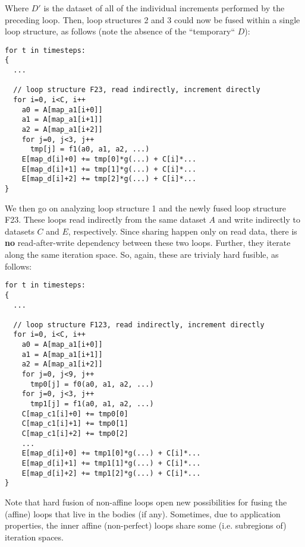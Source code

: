 \documentclass[a4paper]{article}
\begin{document}
Where $D'$ is the dataset of all of the individual increments performed by the preceding loop. Then, loop structures 2 and 3 could now be fused within a single loop structure, as follows (note the absence of the ``temporary`` $D$):

\begin{footnotesize}
\begin{lstlisting}
for t in timesteps:
{
  ...
          
  // loop structure F23, read indirectly, increment directly
  for i=0, i<C, i++
    a0 = A[map_a1[i+0]]
    a1 = A[map_a1[i+1]]
    a2 = A[map_a1[i+2]]
    for j=0, j<3, j++
      tmp[j] = f1(a0, a1, a2, ...)
    E[map_d[i]+0] += tmp[0]*g(...) + C[i]*...
    E[map_d[i]+1] += tmp[1]*g(...) + C[i]*...
    E[map_d[i]+2] += tmp[2]*g(...) + C[i]*...
}
\end{lstlisting}
\end{footnotesize}

We then go on analyzing loop structure 1 and the newly fused loop structure F23. These loops read indirectly from the same dataset $A$ and write indirectly to datasets $C$ and $E$, respectively. Since sharing happen only on read data, there is \textbf{no} read-after-write dependency between these two loops. Further, they iterate along the same iteration space. So, again, these are trivialy hard fusible, as follows:

\begin{footnotesize}
\begin{lstlisting}
for t in timesteps:
{
  ...
          
  // loop structure F123, read indirectly, increment directly
  for i=0, i<C, i++
    a0 = A[map_a1[i+0]]
    a1 = A[map_a1[i+1]]
    a2 = A[map_a1[i+2]]
    for j=0, j<9, j++
      tmp0[j] = f0(a0, a1, a2, ...)
    for j=0, j<3, j++
      tmp1[j] = f1(a0, a1, a2, ...)
    C[map_c1[i]+0] += tmp0[0]
    C[map_c1[i]+1] += tmp0[1]
    C[map_c1[i]+2] += tmp0[2]
    ...
    E[map_d[i]+0] += tmp1[0]*g(...) + C[i]*...
    E[map_d[i]+1] += tmp1[1]*g(...) + C[i]*...
    E[map_d[i]+2] += tmp1[2]*g(...) + C[i]*...
}
\end{lstlisting}
\end{footnotesize}

Note that hard fusion of non-affine loops open new possibilities for fusing the (affine) loops that live in the bodies (if any). Sometimes, due to application properties, the inner affine (non-perfect) loops share some (i.e. subregions of) iteration spaces. 
\end{document}
